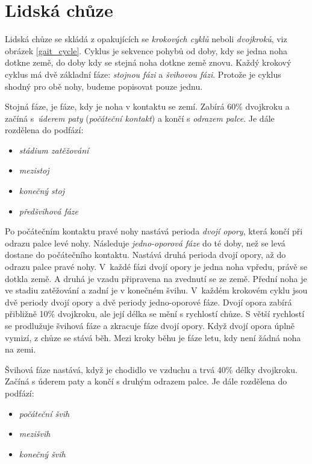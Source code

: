 \chapter{Lidská chůze}
Lidská chůze \cite{gait_review} se skládá z opakujících se \textit{krokových cyklů} neboli \textit{dvojkroků}, viz obrázek \ref{gait_cycle}. Cyklus je sekvence pohybů od doby, kdy se jedna noha dotkne země, do doby kdy se stejná noha dotkne země znovu. Každý krokový cyklus má dvě základní fáze: \textit{stojnou fázi} a \textit{švihovou fázi}. Protože je cyklus shodný pro obě nohy, budeme popisovat pouze jednu.

Stojná fáze, je fáze, kdy je noha v kontaktu se zemí. Zabírá 60\% dvojkroku a začíná s~\textit{úderem paty} (\textit{počáteční kontakt}) a končí s \textit{odrazem palce}. Je dále rozdělena do podfází:
\begin{itemize}
\item \textit{stádium zatěžování}
\item \textit{mezistoj}
\item \textit{konečný stoj}
\item \textit{předšvihová fáze}
\end{itemize}
Po počátečním kontaktu pravé nohy nastává perioda \textit{dvojí opory}, která končí při odrazu palce levé nohy. Následuje \textit{jedno-oporová fáze} do té doby, než se levá dostane do počátečního kontaktu. Nastává druhá perioda dvojí opory, až do odrazu palce pravé nohy. V~každé fázi dvojí opory je jedna noha vpředu, právě se dotkla země. A druhá je vzadu připravena na zvednutí se ze země. Přední noha je ve stadiu zatěžování  a zadní je v konečném švihu. V~každém krokovém cyklu jsou dvě periody dvojí opory a dvě periody jedno-oporové fáze. Dvojí opora zabírá přibližně 10\% dvojkroku, ale její délka se mění s rychlostí chůze. S větší rychlostí se prodlužuje švihová fáze a zkracuje fáze dvojí opory. Když dvojí opora úplně vymizí, z chůze se stává běh. Mezi kroky běhu je fáze letu, kdy není žádná noha na zemi.

Švihová fáze nastává, když je chodidlo ve vzduchu a trvá 40\% délky dvojkroku. Začíná s úderem paty a končí s druhým odrazem palce.  Je dále rozdělena do podfází:
\begin{itemize}
\item \textit{počáteční švih}
\item \textit{mezišvih}
\item \textit{konečný švih}
\end{itemize}

